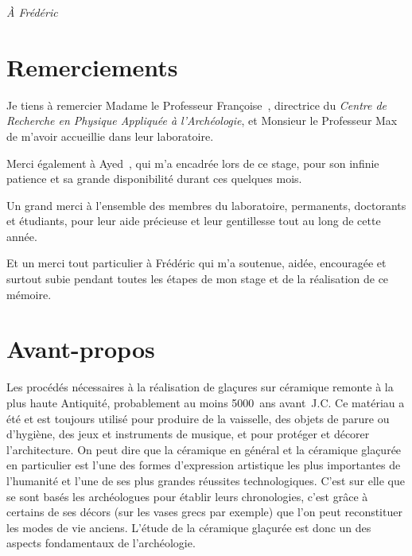 {\raggedleft\itshape À Frédéric \par}


\chapter*{Remerciements}

Je tiens à remercier Madame le Professeur Françoise~, 
directrice du \emph{Centre de Recherche en Physique Appliquée à 
l'Archéologie}, et Monsieur le Professeur Max~ 
de m'avoir accueillie dans leur laboratoire.

\bigskip

Merci également à Ayed~, qui m'a encadrée lors de ce 
stage, pour son infinie patience et sa grande disponibilité durant 
ces quelques mois.

\bigskip

Un grand merci à l'ensemble des membres du laboratoire, permanents, 
doctorants et étudiants, pour leur aide précieuse et leur gentillesse 
tout au long de cette année.

\bigskip

Et un merci tout particulier à Frédéric qui m'a soutenue, aidée, 
encouragée et surtout subie pendant toutes les étapes de mon stage 
et de la réalisation de ce mémoire.

\chapter*{Avant-propos}

Les procédés nécessaires à la réalisation de glaçures sur céramique 
remonte à la plus haute Antiquité, probablement au moins 
\num{5000}~ans avant~J.C. Ce matériau a été et est toujours utilisé 
pour produire de la vaisselle, des objets de parure ou d'hygiène, 
des jeux et instruments de musique, et pour protéger et décorer 
l'architecture. On peut dire que la céramique en général et la 
céramique glaçurée en particulier est l'une des formes d'expression 
artistique les plus importantes de l'humanité et l'une de ses plus 
grandes réussites technologiques. C'est sur elle que se sont basés les 
archéologues pour établir leurs chronologies, c'est grâce à certains 
de ses décors (sur les vases grecs par exemple) que l'on peut 
reconstituer les modes de vie anciens. L'étude de la céramique 
glaçurée est donc un des aspects fondamentaux de l'archéologie.

